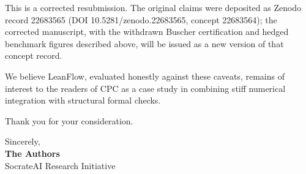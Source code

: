 \documentclass[11pt]{letter}
\begin{document}
This is a corrected resubmission. The original claims were deposited as Zenodo record 22683565 (DOI 10.5281/zenodo.22683565, concept 22683564); the corrected manuscript, with the withdrawn Buscher certification and hedged benchmark figures described above, will be issued as a new version of that concept record.

We believe LeanFlow, evaluated honestly against these caveats, remains of interest to the readers of CPC as a case study in combining stiff numerical integration with structural formal checks.

Thank you for your consideration.

\vspace{1.5em}

\noindent Sincerely, \\
\textbf{The Authors} \\
SocrateAI Research Initiative
\end{document}

